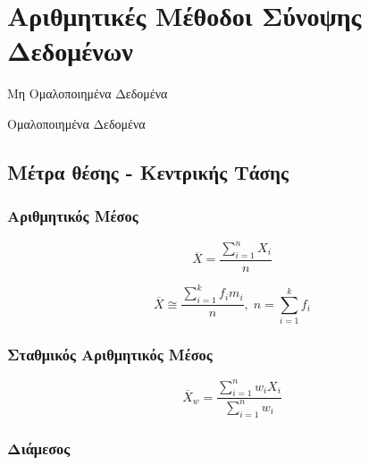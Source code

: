 


\section{Αριθμητικές Μέθοδοι Σύνοψης Δεδομένων}

\begin{multicols}{2}

  Μη Ομαλοποιημένα Δεδομένα

  \columnbreak

  Ομαλοποιημένα Δεδομένα

\end{multicols}

\subsection*{Μέτρα θέσης - Κεντρικής Τάσης}

\subsubsection*{Αριθμητικός Μέσος}

\begin{multicols}{2}
  \begin{equation*}
    \overline{X}=\frac{\sum_{i=1}^{n}X_{i}}{n}
  \end{equation*}

  \begin{equation*}
    \overline{X}\cong\frac{\sum_{i=1}^{k}f_{i}m_{i}}{n},\; n=\sum_{i=1}^{k}f_i
  \end{equation*}
\end{multicols}

\subsubsection*{Σταθμικός Αριθμητικός Μέσος}

\begin{multicols}{2}
  \begin{equation*}
    \overline{X}_{w}=\frac{\sum_{i=1}^{n}w_{i}X_{i}}{\sum_{i=1}^{n}w_{i}}
  \end{equation*}
\end{multicols}


\subsubsection*{Διάμεσος}


